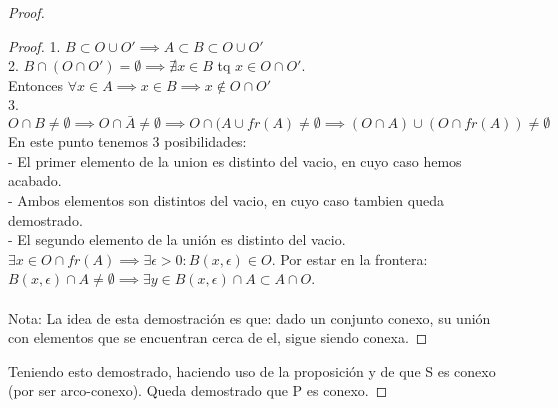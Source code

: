 \begin{ejer}
\begin{proof}
\begin{proof}
 1. $B \subset O \cup O' \implies A \subset B \subset O \cup O'$\\
 2. $B \cap (O\cap O') = \emptyset \implies \nexists x \in B$ tq $x \in O \cap O'$. \\
 Entonces $\forall x \in A \implies x \in B \implies x \not\in O \cap O'$\\
 3. $O \cap B \neq \emptyset \implies O\cap \bar{A} \neq \emptyset \implies O\cap (A\cup fr(A) \neq \emptyset \implies (O\cap A)\cup (O\cap fr(A)) \neq \emptyset$
 En este punto tenemos 3 posibilidades:\\
  - El primer elemento de la union es distinto del vacio, en cuyo caso hemos acabado.\\
  - Ambos elementos son distintos del vacio, en cuyo caso tambien queda demostrado.\\
  - El segundo elemento de la unión es distinto del vacio. $\exists x \in O\cap fr(A) \implies \exists \epsilon > 0 : B(x,\epsilon) \in O$. Por estar en la frontera: $B(x,\epsilon)\cap A \neq \emptyset \implies \exists y \in B(x,\epsilon)\cap A \subset A \cap O$.\\\\

  Nota: La idea de esta demostración es que: dado un conjunto conexo, su unión con elementos que se encuentran cerca de el, sigue siendo conexa.

\end{proof}

Teniendo esto demostrado, haciendo uso de la proposición y de que S es conexo (por ser arco-conexo). Queda demostrado que P es conexo.

\end{proof}

\end{ejer}


